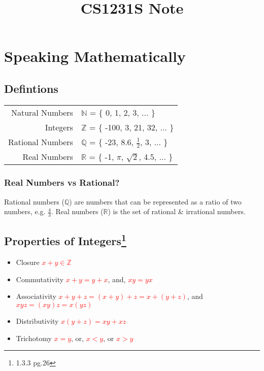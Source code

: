 \documentclass{article}
\title{CS1231S Note}
\begin{document}
\maketitle

\section{Speaking Mathematically}

\subsection{Defintions}

\begin{tabular}{rl}
    Natural Numbers\quad & $\mathbb{N}$ = \{ 0, 1, 2, 3, ... \} \\
    Integers\quad & $\mathbb{Z}$ = \{ -100, 3, 21, 32, ... \} \\
    Rational Numbers\quad & $\mathbb{Q}$ = \{ -23, 8.6, $\frac{1}{2}$, 3, ... \}\\
    Real Numbers\quad & $\mathbb{R}$ = \{ -1, $\pi$, $\sqrt{2}$, 4.5, ...   \}
\end{tabular}

\subsubsection{Real Numbers vs Rational?}
Rational numbers ($\mathbb{Q}$) are numbers that can be represented as a ratio of two numbers, e.g. $\frac{4}{3}$. Real numbers ($\mathbb{R}$) is the set of rational \& irrational numbers.

\subsection[Properties of Integers]{Properties of Integers\footnote{1.3.3 pg.26}}
\begin{itemize}
    \item Closure \quad \textcolor{red}{$x + y \in \mathbb{Z}$}
    \item Commutativity \quad \textcolor{red}{$x + y = y + x$}, and, \textcolor{red}{$xy = yx$}
    \item Associativity \quad \textcolor{red}{$x + y + z = (x + y) + z = x + (y + z)$}, and \textcolor{red}{$xyz=(xy)z=x(yz)$}
    \item Distributivity \quad \textcolor{red}{$x(y+z) = xy + xz$}
    \item Trichotomy \quad \textcolor{red}{$x = y$}, or, \textcolor{red}{$x < y$}, or \textcolor{red}{$x > y$}
\end{itemize}
\end{document}
